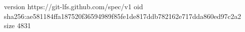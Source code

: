 version https://git-lfs.github.com/spec/v1
oid sha256:ae581184ffa187520f36594989f85fe1de817ddb782162e717dda860ed97c2a2
size 4831
